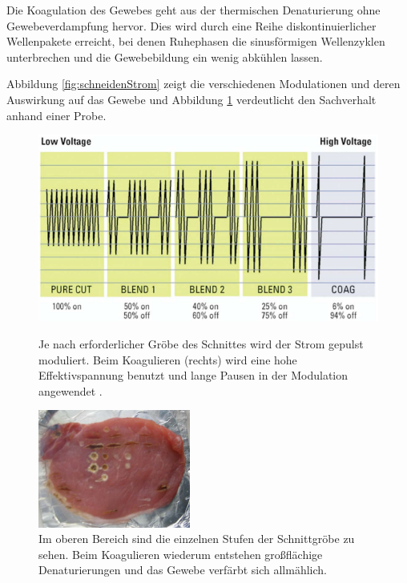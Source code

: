 \documentclass[letterpaper,12pt]{article}
\begin{document}
			Die Koagulation des Gewebes geht aus der thermischen Denaturierung ohne Gewebeverdampfung hervor. Dies wird durch eine Reihe diskontinuierlicher Wellenpakete erreicht, bei denen Ruhephasen die sinusförmigen Wellenzyklen unterbrechen und die Gewebebildung ein wenig abkühlen lassen. 
			
			Abbildung \ref{fig:schneidenStrom} zeigt die verschiedenen Modulationen und deren Auswirkung auf das Gewebe und Abbildung \ref{fig:koagulationStrom} verdeutlicht den Sachverhalt anhand einer Probe.
\begin{figure}[ht]
	\centering
	\begin{minipage}[t]{0.45\linewidth}
		\centering
		\includegraphics[width=\linewidth]{images/_stromModi.png}
		\caption{Je nach erforderlicher Gröbe des Schnittes wird der Strom gepulst moduliert. Beim Koagulieren (rechts) wird eine hohe Effektivspannung benutzt und lange Pausen in der Modulation angewendet \cite{stromModi}.}
		\label{fig:schneidenStrom}
	\end{minipage}
	\hfill
	\begin{minipage}[t]{0.45\linewidth}
		\centering
		\includegraphics[width=5cm]{images/fleisch.png}
		\caption{Im oberen Bereich sind die einzelnen Stufen der Schnittgröbe zu sehen. Beim Koagulieren wiederum entstehen großflächige Denaturierungen und das Gewebe verfärbt sich allmählich.}
		\label{fig:koagulationStrom}
	\end{minipage}
\end{figure}
		
\end{document}
